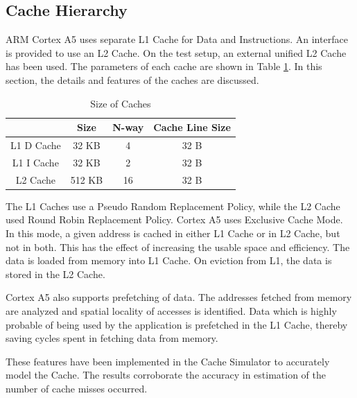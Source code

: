 \subsection{Cache Hierarchy}
\label{sec:c3CacheHierarchy}
ARM Cortex A5 uses separate L1 Cache for Data and Instructions. An interface is provided to use an L2 Cache. On the test setup, an external unified L2 Cache has been used. The parameters of each cache are shown in Table \ref{tbl:cacheSize}. In this section, the details and features of the caches are discussed. 

\vspace*{10pt}
\begin{table}[h]
\centering
\begin{tabular}{cccc}
    \toprule
        &  Size   & N-way   & Cache Line Size \\
    \hline
    L1 D Cache  & 32 KB & 4 & 32 B \\
    L1 I Cache  & 32 KB & 2 & 32 B \\
    L2 Cache    & 512 KB & 16 & 32 B \\
    \bottomrule
\end{tabular}
\caption{Size of Caches}
\label{tbl:cacheSize}
\end{table}

The L1 Caches use a Pseudo Random Replacement Policy, while the L2 Cache used Round Robin Replacement Policy. Cortex A5 uses Exclusive Cache Mode. In this mode, a given address is cached in either L1 Cache or in L2 Cache, but not in both. This has the effect of increasing the usable space and efficiency. The data is loaded from memory into L1 Cache. On eviction from L1, the data is stored in the L2 Cache.

Cortex A5 also supports prefetching of data. The addresses fetched from memory are analyzed and spatial locality of accesses is identified. Data which is highly probable of being used by the application is prefetched in the L1 Cache, thereby saving cycles spent in fetching data from memory.

These features have been implemented in the Cache Simulator to accurately model the Cache. The results corroborate the accuracy in estimation of the number of cache misses occurred. 


